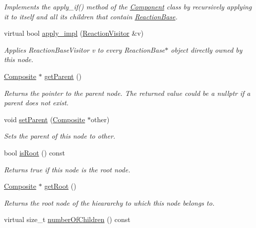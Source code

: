 \begin{DoxyCompactItemize}
\begin{DoxyCompactList}\small\item\em Implements the apply\+\_\+if() method of the \hyperlink{classComponent}{Component} class by recursively applying it to itself and all its children that contain \hyperlink{classReactionBase}{Reaction\+Base}. \end{DoxyCompactList}\item 
virtual bool \hyperlink{classComponent_ac9296f41e0b9c254d5adea9df3b4b07a}{apply\+\_\+impl} (\hyperlink{classReactionVisitor}{Reaction\+Visitor} \&v)
\begin{DoxyCompactList}\small\item\em Applies Reaction\+Base\+Visitor v to every Reaction\+Base$\ast$ object directly owned by this node. \end{DoxyCompactList}\item 
\hyperlink{classComposite}{Composite} $\ast$ \hyperlink{classComponent_a4bb9041a7f3854f25f45060e81bb4e4e}{get\+Parent} ()
\begin{DoxyCompactList}\small\item\em Returns the pointer to the parent node. The returned value could be a nullptr if a parent does not exist. \end{DoxyCompactList}\item 
void \hyperlink{classComponent_a9d5b03697a653cda24d5688af1d105f8}{set\+Parent} (\hyperlink{classComposite}{Composite} $\ast$other)
\begin{DoxyCompactList}\small\item\em Sets the parent of this node to other. \end{DoxyCompactList}\item 
bool \hyperlink{classComponent_a4f0bed8144509d6565a30b548fac0fe7}{is\+Root} () const 
\begin{DoxyCompactList}\small\item\em Returns true if this node is the root node. \end{DoxyCompactList}\item 
\hyperlink{classComposite}{Composite} $\ast$ \hyperlink{classComponent_abcb3746cb8b4afcecf437dce40c0c772}{get\+Root} ()
\begin{DoxyCompactList}\small\item\em Returns the root node of the hieararchy to which this node belongs to. \end{DoxyCompactList}\item 
virtual size\+\_\+t \hyperlink{classComponent_a42566ba7ad92afe0d84d9d1d4e05745e}{number\+Of\+Children} () const 

\end{DoxyCompactItemize}
